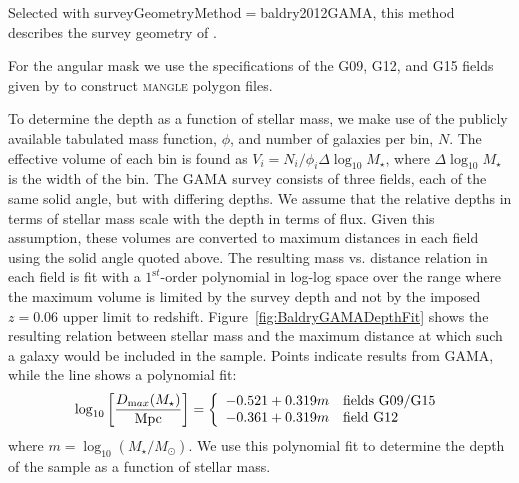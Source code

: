 Selected with {\normalfont \ttfamily surveyGeometryMethod}$=${\normalfont \ttfamily baldry2012GAMA}, this method describes the survey geometry of \cite{baldry_galaxy_2012}. 

For the angular mask we use the specifications of the G09, G12, and G15 fields given by \cite{driver_galaxy_2011} to construct {\normalfont \scshape mangle} polygon files.

To determine the depth as a function of stellar mass, we make use of the publicly available tabulated mass function, $\phi$, and number of galaxies per bin, $N$. The effective volume of each bin is found as $V_i = N_i/\phi_i\Delta\log_{10}M_\star$, where $\Delta\log_{10}M_\star$ is the width of the bin. The GAMA survey consists of three fields, each of the same solid angle, but with differing depths. We assume that the relative depths in terms of stellar mass scale with the depth in terms of flux. Given this assumption, these volumes are converted to maximum distances in each field using the solid angle quoted above. The resulting mass vs. distance relation in each field is fit with a $1^{\mathrm st}$-order polynomial in log-log space over the range where the maximum volume is limited by the survey depth and not by the imposed $z=0.06$ upper limit to redshift. Figure~\ref{fig:BaldryGAMADepthFit} shows the resulting relation between stellar mass and the maximum distance at which such a galaxy would be included in the sample. Points indicate results from GAMA, while the line shows a polynomial fit:
\begin{equation}
 \log_{10} \left[ {D_{\mathrm max}(M_\star) \over \hbox{Mpc}}\right] = \left\{ \begin{array}{ll} -0.521 + 0.319m & \hbox{fields G09/G15} \\ -0.361 + 0.319m & \hbox{field G12} \end{array} \right.
 \label{eq:BaldryDepthPolynomial}
\end{equation}
where $m= \log_{10}(M_\star/M_\odot)$. We use this polynomial fit to determine the depth of the sample as a function of stellar mass.

